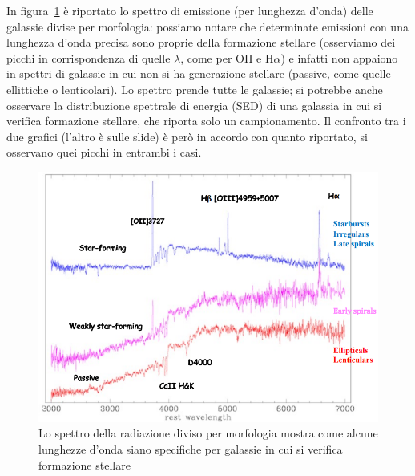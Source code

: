 In figura~\ref{fig:spettro+galassie} è riportato lo spettro di emissione (per lunghezza d'onda) delle galassie divise per morfologia: possiamo notare che determinate emissioni con una lunghezza d'onda precisa sono proprie della formazione stellare (osserviamo dei picchi in corrispondenza di quelle $\lambda$, come per OII e H$\alpha$) e infatti non appaiono in spettri di galassie in cui non si ha generazione stellare (passive, come quelle ellittiche o lenticolari). Lo spettro prende tutte le galassie; si potrebbe anche osservare la distribuzione spettrale di energia (SED) di una galassia in cui si verifica formazione stellare, che riporta solo un campionamento. Il confronto tra i due grafici (l'altro è sulle slide) è però in accordo con quanto riportato, si osservano quei picchi in entrambi i casi.

\begin{figure}
    \centering
    \includegraphics[width = 0.5 \textwidth]{immagini/spettro-galassie.png}
    \caption{Lo spettro della radiazione diviso per morfologia mostra come alcune lunghezze d'onda siano specifiche per galassie in cui si verifica formazione stellare}
    \label{fig:spettro+galassie}
\end{figure}

